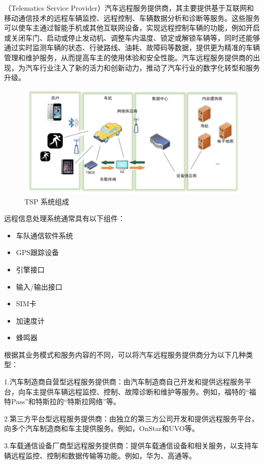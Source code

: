 （Telematics Service Provider）汽车远程服务提供商，其主要提供基于互联网和移动通信技术的远程车辆监控、远程控制、车辆数据分析和诊断等服务。这些服务可以使车主通过智能手机或其他互联网设备，实现远程控制车辆的功能，例如开启或关闭车门、启动或停止发动机、调整车内温度、锁定或解锁车辆等，同时还能够通过实时监测车辆的状态、行驶路线、油耗、故障码等数据，提供更为精准的车辆管理和维护服务，从而提高车主的使用体验和安全性能。汽车远程服务提供商的出现，为汽车行业注入了新的活力和创新动力，推动了汽车行业的数字化转型和服务升级。
 \begin{figure}
    \centering
    \includegraphics[scale=0.6]{resources/img/i2.png}
    \caption{TSP 系统组成}
  \end{figure}

  远程信息处理系统通常具有以下组件：
  \begin{itemize}
    \item 车队通信软件系统
    \item GPS跟踪设备
    \item 引擎接口
    \item 输入/输出接口
    \item SIM卡
    \item 加速度计
    \item 蜂鸣器
  \end{itemize}

  根据其业务模式和服务内容的不同，可以将汽车远程服务提供商分为以下几种类型：

  1.汽车制造商自营型远程服务提供商：由汽车制造商自己开发和提供远程服务平台，向车主提供车辆远程监控、控制、故障诊断和维护等服务。例如，福特的“福特Pass”和特斯拉的“特斯拉网络”等。
  
  2.第三方平台型远程服务提供商：由独立的第三方公司开发和提供远程服务平台，向多个汽车制造商和车主提供服务。例如，OnStar和UVO等。
  
  3.车载通信设备厂商型远程服务提供商：提供车载通信设备和相关服务，以支持车辆远程监控、控制和数据传输等功能。例如，华为、高通等。
  
